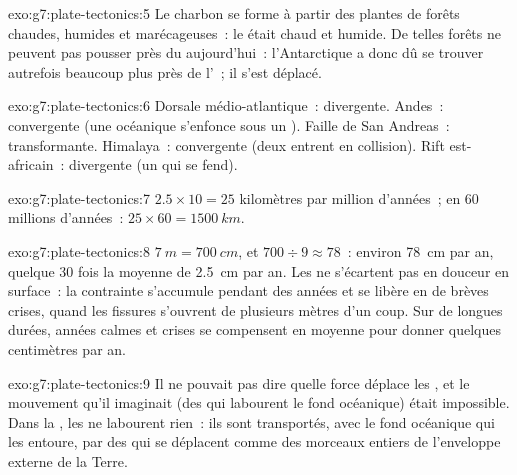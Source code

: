 \begin{solution}{exo:g7:plate-tectonics:5}
Le charbon se forme à partir des plantes de forêts chaudes, humides et
marécageuses~: le  était chaud et humide. De telles forêts ne peuvent
pas pousser près du  aujourd'hui~: l'Antarctique a donc dû se
trouver autrefois beaucoup plus près de l'~; il s'est déplacé.
\end{solution}

\begin{solution}{exo:g7:plate-tectonics:6}
Dorsale médio-atlantique~: divergente. Andes~: convergente (une 
océanique s'enfonce sous un ). Faille de San Andreas~:
transformante. Himalaya~: convergente (deux  entrent en
collision). Rift est-africain~: divergente (un  qui se fend).
\end{solution}

\begin{solution}{exo:g7:plate-tectonics:7}
$2.5 \times 10 = 25$ kilomètres par million d'années~; en 60 millions
d'années~: $25 \times 60 = \qty{1500}{km}$.
\end{solution}

\begin{solution}{exo:g7:plate-tectonics:8}
$\qty{7}{m} = \qty{700}{cm}$, et $700 \div 9 \approx 78$~: environ
\qty{78}{cm} par an, quelque 30 fois la moyenne de \qty{2.5}{cm} par an.
Les  ne s'écartent pas en douceur en surface~: la contrainte
s'accumule pendant des années et se libère en de brèves crises, quand les
fissures s'ouvrent de plusieurs mètres d'un coup. Sur de longues durées,
années calmes et crises se compensent en moyenne pour donner quelques
centimètres par an.
\end{solution}

\begin{solution}{exo:g7:plate-tectonics:9}
Il ne pouvait pas dire quelle force déplace les , et le
mouvement qu'il imaginait (des  qui labourent le fond océanique)
était impossible. Dans la , les  ne
labourent rien~: ils sont transportés, avec le fond océanique qui les
entoure, par des  qui se déplacent comme des morceaux entiers de
l'enveloppe externe de la Terre.
\end{solution}

